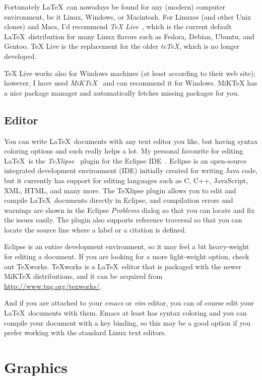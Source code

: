 \documentclass[12pt,a4paper,oneside,pdftex]{report}
\begin{document}
Fortunately \LaTeX\ can nowadays be found for any (modern) computer
environment, be it Linux, Windows, or Macintosh.
For Linuxes (and other Unix clones) and Macs, I'd recommend \emph{TeX
Live}~\cite{TeXLive}, which is the current default \LaTeX\ distribution for
many Linux flavors such as Fedora, Debian, Ubuntu, and Gentoo.
TeX Live is the replacement for the older \emph{teTeX}, which is
no longer developed.

TeX Live works also for Windows machines (at least according to their web
site); however, I have used \emph{MiKTeX}~\cite{MiKTeX} and can recommend it
for Windows.
MiKTeX has a nice package manager and automatically fetches missing packages
for you.

\subsection{Editor}

You can write \LaTeX\ documents with any text editor you like, but having
syntax coloring options and such really helps a lot.
My personal favourite for editing \LaTeX\ is the
\emph{TeXlipse}~\cite{TeXlipse} plugin for the Eclipse IDE~\cite{Eclipse}.
Eclipse is an open-source integrated development environment (IDE) initially
created for writing Java code, but it currently has support for editing
languages such as C, C++, JavaScript, XML, HTML, and many more.
The TeXlipse plugin allows you to edit and compile \LaTeX\ documents directly
in Eclipse, and compilation errors and warnings are shown in the Eclipse
\emph{Problems} dialog so that you can locate and fix the issues easily.
The plugin also supports reference traversal so that you can locate the source
line where a label or a citation is defined.

Eclipse is an entire development environment, so it may feel a bit heavy-weight
for editing a document.
If you are looking for a more light-weight option, check out TeXworks.
TeXworks is a \LaTeX\ editor that is packaged with the newer MiKTeX
distributions, and it can be acquired from \url{http://www.tug.org/texworks/}.

And if you are attached to your \emph{emacs} or \emph{vim} editor, you
can of course edit your \LaTeX\ documents with them.
Emacs at least has syntax coloring and you can compile your document with a key
binding, so this may be a good option if you prefer working with the standard
Linux text editors.

\section{Graphics}
\end{document}

